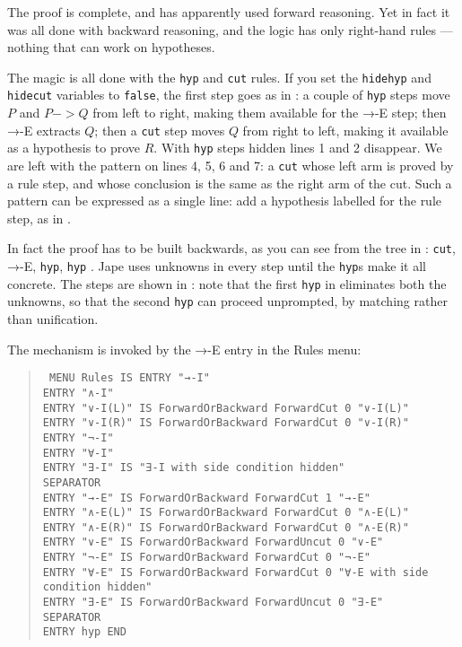 The proof is complete, and has apparently used forward reasoning. Yet in fact it was all done with backward reasoning, and the logic has only right-hand rules --- nothing that can work on hypotheses.

The magic is all done with the \texttt{hyp} and \texttt{cut} rules. If you set the \texttt{hidehyp} and \texttt{hidecut} variables to \texttt{false}, the first step goes as in : a couple of \texttt{hyp} steps move $P$ and $P->Q$ from left to right, making them available for the →-E step; then →-E extracts $Q$; then a \texttt{cut} step moves $Q$ from right to left, making it available as a hypothesis to prove $R$. With \texttt{hyp} steps hidden lines 1 and 2 disappear. We are left with the pattern on lines 4, 5, 6 and 7: a \texttt{cut} whose left arm is proved by a rule step, and whose conclusion is the same as the right arm of the cut. Such a pattern can be expressed as a single line: add a hypothesis labelled for the rule step, as in .

In fact the proof has to be built backwards, as you can see from the tree in : \texttt{cut}, →-E, \texttt{hyp}, \texttt{hyp} . Jape uses unknowns in every step until the \texttt{hyp}s make it all concrete. The steps are shown in : note that the first \texttt{hyp} in  eliminates both the unknowns, so that the second \texttt{hyp} can proceed unprompted, by matching rather than unification.

The mechanism is invoked by the →-E entry in the Rules menu:
\begin{quote}\tt\small
MENU Rules IS
    ENTRY "→-I" \\
    ENTRY "∧-I"    \\
    ENTRY "∨-I(L)"  IS ForwardOrBackward ForwardCut 0 "∨-I(L)"\\
    ENTRY "∨-I(R)"  IS ForwardOrBackward ForwardCut 0 "∨-I(R)"\\
    ENTRY "¬-I"\\
    ENTRY "∀-I"\\
    ENTRY "∃-I"     IS "∃-I with side condition hidden"\\
    SEPARATOR\\
    ENTRY "→-E"     IS ForwardOrBackward ForwardCut 1 "→-E" \\
    ENTRY "∧-E(L)"  IS ForwardOrBackward ForwardCut 0 "∧-E(L)"\\
    ENTRY "∧-E(R)"  IS ForwardOrBackward ForwardCut 0 "∧-E(R)"\\
    ENTRY "∨-E"     IS ForwardOrBackward ForwardUncut 0 "∨-E"  \\ 
    ENTRY "¬-E"     IS ForwardOrBackward ForwardCut 0 "¬-E" \\
    ENTRY "∀-E"     IS ForwardOrBackward ForwardCut 0 "∀-E with side condition hidden"\\  
    ENTRY "∃-E"     IS ForwardOrBackward ForwardUncut 0 "∃-E"\\
    SEPARATOR\\
    ENTRY hyp
END
\end{quote}

